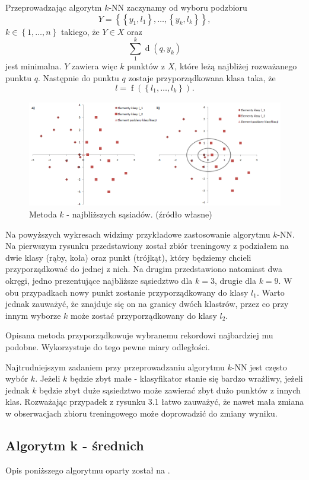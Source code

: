 \documentclass[12pt,a4paper]{report}
\newcommand{\set}[1]{\left\lbrace {#1} \right\rbrace}
\newcommand{\distance}[2]{\operatorname{d}\left({#1}, {#2} \right)}
\newcommand{\f}[2][]{\operatorname{f}\left( {#2} \right)_{#1}}
\begin{document}
Przeprowadzając algorytm $k$-NN zaczynamy od wyboru podzbioru
$$
\mathit{Y}=\set{\set{y_1,l_1},\ldots,\set{y_k,l_k}}, 
$$
$k\in\set{1,\ldots,n}$ takiego, że $\mathit{Y} \in \mathit{X}$ oraz 
$$
\sum_1^k \distance{q}{y_k}
$$ 
jest minimalna. $\mathit{Y}$ zawiera więc $k$ punktów z $\mathit{X}$, które leżą najbliżej rozważanego punktu $q$. Następnie do punktu $q$ zostaje przyporządkowana klasa taka, że $$
l=\f{\set{l_1,\ldots,l_k}}.
$$
\begin{center}
\begin{figure}[H]
\centering
\includegraphics[scale=0.5]{obrazy/kNN.PNG} 
\caption{Metoda $k$ - najbliższych sąsiadów. (źródło własne)}
\end{figure}
\end{center}

Na powyższych wykresach widzimy przykładowe zastosowanie algorytmu $k$-NN. Na pierwszym rysunku przedstawiony został zbiór treningowy z podziałem na dwie klasy (rąby, koła) oraz punkt (trójkąt), który będziemy chcieli przyporządkować do jednej z nich. Na drugim przedstawiono natomiast dwa okręgi, jedno prezentujące najbliższe sąsiedztwo dla $k = 3$, drugie dla $k = 9$. W obu przypadkach nowy punkt zostanie przyporządkowany do klasy $l_1$. Warto jednak zauważyć, że znajduje się on na granicy dwóch klastrów, przez co przy innym wyborze $k$ może zostać przyporządkowany do klasy $l_2$.

Opisana metoda przyporządkowuje wybranemu rekordowi najbardziej mu podobne. Wykorzystuje do tego pewne miary odległości.

Najtrudniejszym zadaniem przy przeprowadzaniu algorytmu $k$-NN jest często wybór $k$. Jeżeli $k$ będzie zbyt małe - klasyfikator stanie się bardzo wrażliwy, jeżeli jednak $k$ będzie zbyt duże sąsiedztwo może zawierać zbyt dużo punktów z innych klas. Rozważając przypadek z rysunku 3.1 łatwo zauważyć, że nawet mała zmiana w obserwacjach zbioru treningowego może doprowadzić do zmiany wyniku.

\subsection{Algorytm k - średnich} 
Opis poniższego algorytmu oparty został na {\citep[Sec 2.3.1]{ascgdpds}}.
\end{document}

